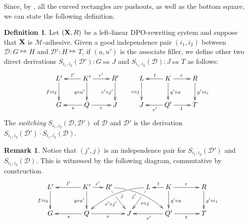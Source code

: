 \documentclass[a4paper]{article}
\def\X{\textbf {\textup{X}}}
\newcommand{\dder}[1]{\mathscr{#1}}
\newcommand{\sder}[2]{S_{i_1,i_2}(\mathscr{#1}, \mathscr{#2})}
\theoremstyle{definition}
\newtheorem{definition}[theorem]{Definition}
\newtheorem{remark}[theorem]{Remark}
\begin{document}
	Since, by , all the curved rectangles are pushouts, as well as the bottom square, we can state the following definition.
\begin{definition}\label{def:switch}
	Let $(\X,R)$ be a left-linear DPO-rewriting system and suppose that $\X$ is $\mathcal{M}$-adhesive. Given a good independence pair $(i_1, i_2)$ between $\dder{D}\colon G\Mapsto H$ and $\dder{D}'\colon H\Mapsto T$, if $(u,u')$ is the associate filler, we define other two direct derivations $S_{i_1,i_2}(\dder{D}')\colon G\Mapsto J$ and $S_{i_1,i_2}(\dder{D})\colon J\Mapsto T$ as follows:
		\[\xymatrix{L' \ar[d]_{f\circ i_2}& \ar[l]_{l'}K'\ar[d]_{q\circ u'} \ar[r]^{r'} & R' \ar[d]_{v'\circ j'} & L \ar[d]_{v\circ j} & \ar[l]_{l}K \ar[d]^{q'\circ u}\ar[r]^{r}& R \ar[d]^{g'\circ i_1}\\
		G &\ar[l]^{s} Q \ar[r]_{v}& J&J & \ar[l]^{v'}Q' \ar[r]_{t} & T}\]
	The \emph{switching} $\sder{D}{D'}$ of $\dder{D}$ and $\dder{D'}$ is the derivation $S_{i_1,i_2}(\dder{D}')\cdot S_{i_1,i_2}(\dder{D})$.
\end{definition}

\begin{remark}\label{rem:indip}Notice that $(j', j)$ is an independence pair for $S_{i_1,i_2}(\dder{D}')$ and $S_{i_1,i_2}(\dder{D})$. This is witnessed by the following diagram, commutative by construction.
	\[\xymatrix@C=15pt{L' \ar[d]_{f\circ i_2}&& K' \ar[d]_{q\circ u'}\ar[ll]_{l'} \ar[r]^{r'} & R' \ar@/^.35cm/[drrr]_(.4){j'}|(.285)\hole \ar[dr]|(.28)\hole_{v'\circ j'} && L \ar@/_.35cm/[dlll]^(.4){j} \ar[dl]|(.28)\hole^{v\circ j}& K \ar[d]^{q'\circ u}\ar[l]_{l} \ar[rr]^{r} && R \ar[d]^{g'\circ i_1}\\G && \ar[ll]^{s} Q \ar[rr]_{v}&& J  && \ar[ll]^{v'} Q' \ar[rr]_{t}&& T}\]
\end{remark} 
 
\end{document}
